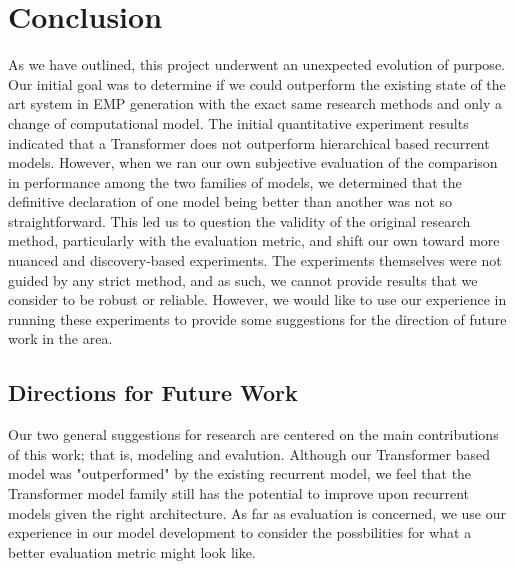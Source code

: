 \chapter{Conclusion} \label{ch:ch8}

As we have outlined, this project underwent an unexpected evolution of purpose. Our initial goal was to determine if we could outperform the existing state of the art system in EMP generation with the exact same research methods and only a change of computational model. The initial quantitative experiment results indicated that a Transformer does not outperform hierarchical based recurrent models. However, when we ran our own subjective evaluation of the comparison in performance among the two families of models, we determined that the definitive declaration of one model being better than another was not so straightforward. This led us to question the validity of the original research method, particularly with the evaluation metric, and shift our own toward more nuanced and discovery-based experiments. The experiments themselves were not guided by any strict method, and as such, we cannot provide results that we consider to be robust or reliable. However, we would like to use our experience in running these experiments to provide some suggestions for the direction of future work in the area. 

\section{Directions for Future Work}
Our two general suggestions for research are centered on the main contributions of this work; that is, modeling and evalution. Although our Transformer based model was "outperformed" by the existing recurrent model, we feel that the Transformer model family still has the potential to improve upon recurrent models given the right architecture. As far as evaluation is concerned, we use our experience in our model development to consider the possbilities for what a better evaluation metric might look like. 

